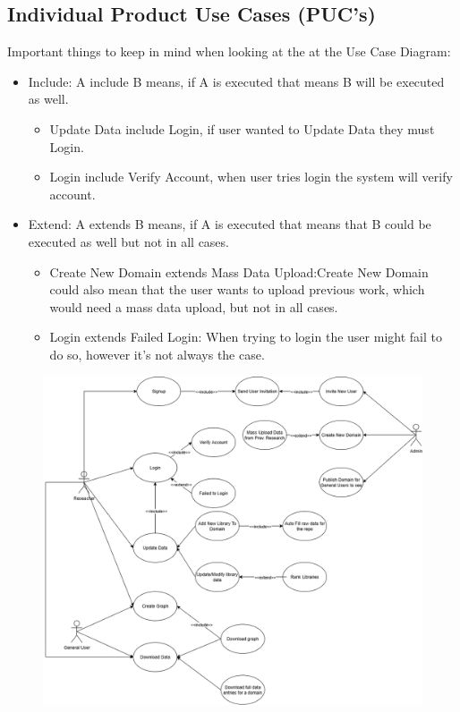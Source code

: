 \documentclass[12pt]{article}
\begin{document}
\subsection{Individual Product Use Cases (PUC's)}
Important things to keep in mind when looking at the at the Use Case Diagram:
\begin{itemize}
  \item Include: A  include B means, if A is executed that means B will be executed as well. 
  \begin{itemize}
    \item Update Data include Login, if user wanted to Update Data they must Login.
    \item Login include Verify Account, when user tries login the system will verify account.
  \end{itemize}
  \item Extend: A extends B means, if A is executed that means that B could be executed as well but not in all cases.
  \begin{itemize}
    \item Create New Domain extends Mass Data Upload:Create New Domain could also mean that the user wants to upload previous work, which would need a mass data upload, but not in all cases.
    \item Login extends Failed Login: When trying to login the user might fail to do so, however it's not always the case.
  \end{itemize}
\end{itemize}
\begin{figure}[H]
    \centering
    \includegraphics[scale=0.45] {usecase.png}
\end{figure}
\end{document}
